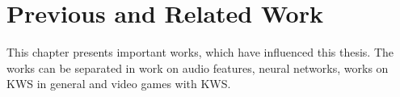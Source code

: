 
\chapter{Previous and Related Work}\label{sec:prev}
\thesisStateRevised
This chapter presents important works, which have influenced this thesis.
The works can be separated in work on audio features, neural networks, works on KWS in general and video games with KWS.







